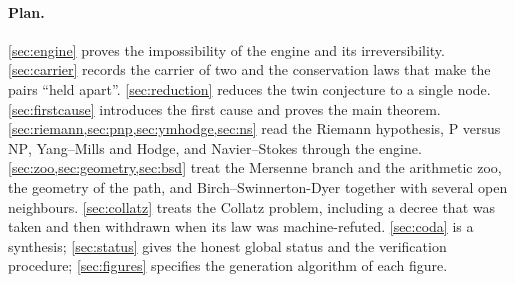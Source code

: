 \paragraph{Plan.}
\cref{sec:engine} proves the impossibility of the engine and its irreversibility.
\cref{sec:carrier} records the carrier of two and the conservation laws that make the pairs
``held apart''. \cref{sec:reduction} reduces the twin conjecture to a single node. \cref{sec:firstcause}
introduces the first cause and proves the main theorem. \cref{sec:riemann,sec:pnp,sec:ymhodge,sec:ns}
read the Riemann hypothesis, $\mathrm{P}$ versus $\mathrm{NP}$, Yang--Mills and Hodge, and
Navier--Stokes through the engine. \cref{sec:zoo,sec:geometry,sec:bsd} treat the Mersenne branch
and the arithmetic zoo, the geometry of the path, and Birch--Swinnerton-Dyer together with several
open neighbours. \cref{sec:collatz} treats the Collatz problem, including a decree that was taken
and then withdrawn when its law was machine-refuted. \cref{sec:coda} is a synthesis;
\cref{sec:status} gives the honest global status and the verification procedure; \cref{sec:figures}
specifies the generation algorithm of each figure.
